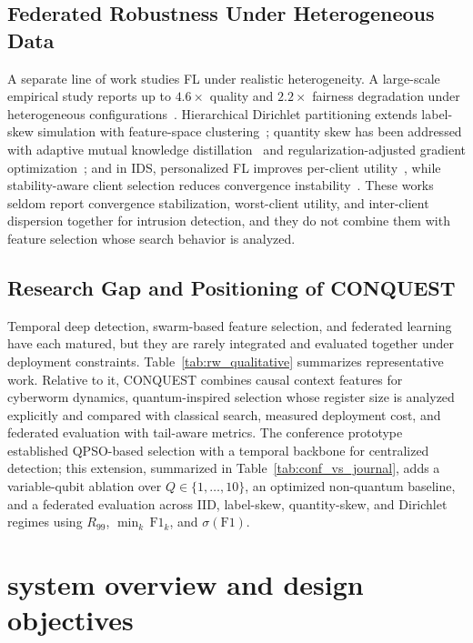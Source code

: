 \documentclass[conference]{IEEEtran}
\begin{document}
\subsection{Federated Robustness Under Heterogeneous Data}

A separate line of work studies FL under realistic heterogeneity. A
large-scale empirical study reports up to $4.6\times$ quality and
$2.2\times$ fairness degradation under heterogeneous
configurations~\cite{abdelmoniemcomprehensive}. Hierarchical
Dirichlet partitioning extends label-skew simulation with
feature-space clustering~\cite{arisdakessiantwo}; quantity skew has
been addressed with adaptive mutual knowledge
distillation~\cite{gefedamkd} and regularization-adjusted gradient
optimization~\cite{chaaddressing}; and in IDS, personalized FL
improves per-client utility~\cite{almansouradaptive}, while
stability-aware client selection reduces convergence
instability~\cite{vinothinienhancing}. These works seldom report
convergence stabilization, worst-client utility, and inter-client
dispersion together for intrusion detection, and they do not combine
them with feature selection whose search behavior is analyzed.

\subsection{Research Gap and Positioning of CONQUEST}

Temporal deep detection, swarm-based feature selection, and federated
learning have each matured, but they are rarely integrated and
evaluated together under deployment constraints.
Table~\ref{tab:rw_qualitative} summarizes representative work.
Relative to it, CONQUEST combines causal context features for
cyberworm dynamics, quantum-inspired selection whose register size is
analyzed explicitly and compared with classical search, measured
deployment cost, and federated evaluation with tail-aware metrics.
The conference prototype~\cite{ajakweconquest} established QPSO-based
selection with a temporal backbone for centralized detection; this
extension, summarized in
Table~\ref{tab:conf_vs_journal}, adds a variable-qubit ablation over
$Q\in\{1,\dots,10\}$, an optimized
non-quantum baseline, and a federated evaluation across IID,
label-skew, quantity-skew, and Dirichlet regimes using $R_{99}$,
$\min_k\,\mathrm{F1}_k$, and $\sigma(\mathrm{F1})$.





\section{\textbf{system overview and design objectives}}
\label{sec:conquest_overview}
\end{document}
